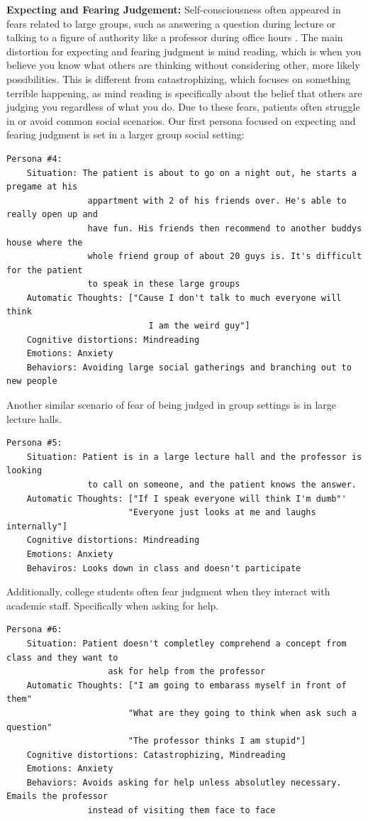 \documentclass[twoside]{report}
\begin{document}
\textbf{Expecting and Fearing Judgement:} Self-consciousness often appeared in fears related to large groups, such as answering a question during lecture or talking to a figure of authority like a professor during office hours \cite{lee2022socially}. The main distortion for expecting and fearing judgment is mind reading, which is when you believe you know what others are thinking without considering other, more likely possibilities. This is different from catastrophizing, which focuses on something terrible happening, as mind reading is specifically about the belief that others are judging you regardless of what you do. Due to these fears, patients often struggle in or avoid common social scenarios. Our first persona focused on expecting and fearing judgment is set in a larger group social setting:
\begin{verbatim}
Persona #4:
    Situation: The patient is about to go on a night out, he starts a pregame at his 
                appartment with 2 of his friends over. He's able to really open up and 
                have fun. His friends then recommend to another buddys house where the
                whole friend group of about 20 guys is. It's difficult for the patient 
                to speak in these large groups
    Automatic Thoughts: ["Cause I don't talk to much everyone will think 
                            I am the weird guy"]
    Cognitive distortions: Mindreading
    Emotions: Anxiety
    Behaviors: Avoiding large social gatherings and branching out to new people
\end{verbatim}
Another similar scenario of fear of being judged in group settings is in large lecture halls. 
\begin{verbatim}
Persona #5:
    Situation: Patient is in a large lecture hall and the professor is looking 
                to call on someone, and the patient knows the answer.
    Automatic Thoughts: ["If I speak everyone will think I'm dumb"'
                        "Everyone just looks at me and laughs internally"]
    Cognitive distortions: Mindreading
    Emotions: Anxiety
    Behaviros: Looks down in class and doesn't participate
\end{verbatim}
Additionally, college students often fear judgment when they interact with academic staff. Specifically when asking for help. 
\begin{verbatim}
Persona #6:
    Situation: Patient doesn't completley comprehend a concept from class and they want to 
                    ask for help from the professor
    Automatic Thoughts: ["I am going to embarass myself in front of them"
                        "What are they going to think when ask such a question"
                        "The professor thinks I am stupid"]
    Cognitive distortions: Catastrophizing, Mindreading
    Emotions: Anxiety
    Behaviors: Avoids asking for help unless absolutley necessary. Emails the professor
                instead of visiting them face to face
\end{verbatim}
\end{document}
